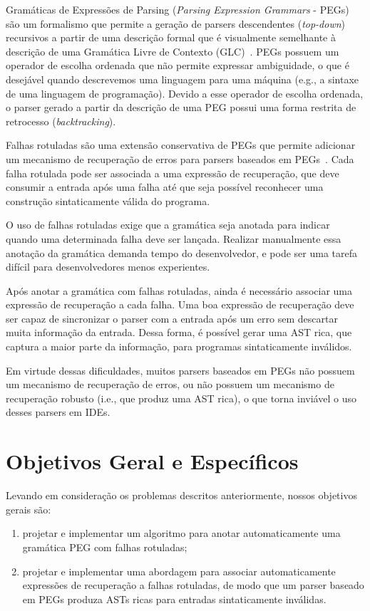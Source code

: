 \documentclass[titlepage,12pt]{article}
\begin{document}
Gramáticas de Expressões de Parsing (\textit{Parsing Expression Grammars} - 
PEGs)~\cite{ford2002thesis,ford2004peg}
são um formalismo que permite a geração de parsers descendentes (\textit{top-down})
recursivos a partir de uma descrição formal que é visualmente semelhante à descrição
de uma Gramática Livre de Contexto (GLC)~\cite{hopcroft:automata}. PEGs possuem um
operador de escolha ordenada que não permite expressar ambiguidade, o que é desejável quando
descrevemos uma linguagem para uma máquina (e.g., a sintaxe de uma linguagem de programação).
Devido a esse operador de escolha ordenada, o parser gerado a partir da descrição
de uma PEG possui uma forma restrita de retrocesso (\textit{backtracking}).

Falhas rotuladas são uma extensão conservativa de PEGs que permite
adicionar um mecanismo de recuperação de erros para parsers baseados
em PEGs~\cite{maidl2016peglabel}. Cada falha rotulada pode ser associada
a uma expressão de recuperação, que deve consumir a entrada após uma falha
até que seja possível reconhecer uma construção sintaticamente válida do programa.

O uso de falhas rotuladas exige que a gramática seja anotada para indicar
quando uma determinada falha deve ser lançada. Realizar manualmente essa
anotação da gramática demanda tempo do desenvolvedor, e pode ser uma
tarefa difícil para desenvolvedores menos experientes.

Após anotar a gramática com falhas rotuladas, ainda é necessário
associar uma expressão de recuperação a cada falha. Uma boa expressão
de recuperação deve ser capaz de sincronizar o parser com a entrada
após um erro sem descartar muita informação da entrada. Dessa forma,
é possível gerar uma AST rica, que captura a maior parte da informação,
para programas sintaticamente inválidos.
 
Em virtude dessas dificuldades, muitos parsers baseados em PEGs não
possuem um mecanismo de recuperação de erros, ou não possuem um mecanismo
de recuperação robusto (i.e., que produz uma AST rica), o que torna inviável
o uso desses parsers em IDEs. 


\section{Objetivos Geral e Específicos}
\label{sec:obj}


Levando em consideração os problemas descritos anteriormente,
nossos objetivos gerais são:
\begin{enumerate}
	\item projetar e implementar um algoritmo para anotar automaticamente
  uma gramática PEG com falhas rotuladas;
	\item projetar e implementar uma abordagem para associar automaticamente
  expressões de recuperação a falhas rotuladas, de modo que um
  parser baseado em PEGs produza ASTs ricas para entradas sintaticamente
  inválidas.
\end{enumerate}
\end{document}
